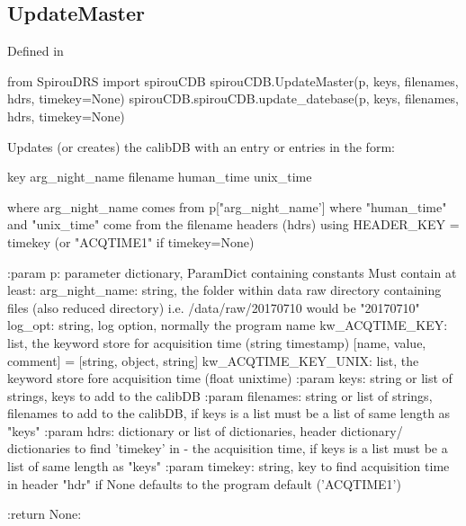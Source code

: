 \noindent\begin{minipage}{\textwidth}
\subsection{UpdateMaster}

Defined in \spirouCDB{}

\begin{pythonbox}
from SpirouDRS import spirouCDB
spirouCDB.UpdateMaster(p, keys, filenames, hdrs, timekey=None)
spirouCDB.spirouCDB.update_datebase(p, keys, filenames, hdrs, timekey=None)
\end{pythonbox}

\begin{pythondocstring}
Updates (or creates) the calibDB with an entry or entries in the form:

    {key} {arg_night_name} {filename} {human_time} {unix_time}

where arg_night_name comes from p["arg_night_name']
where "human_time" and "unix_time" come from the filename headers (hdrs)
    using HEADER_KEY = timekey (or "ACQTIME1" if timekey=None)

:param p: parameter dictionary, ParamDict containing constants
    Must contain at least:
            arg_night_name: string, the folder within data raw directory
                            containing files (also reduced directory) i.e.
                            /data/raw/20170710 would be "20170710"
            log_opt: string, log option, normally the program name
            kw_ACQTIME_KEY: list, the keyword store for acquisition time
                            (string timestamp)
                        [name, value, comment] = [string, object, string]
            kw_ACQTIME_KEY_UNIX: list, the keyword store fore acquisition
                                 time (float unixtime)
:param keys: string or list of strings, keys to add to the calibDB
:param filenames: string or list of strings, filenames to add to the
                  calibDB, if keys is a list must be a list of same length
                  as "keys"
:param hdrs: dictionary or list of dictionaries, header dictionary/
             dictionaries to find 'timekey' in - the acquisition time,
             if keys is a list must be a list of same length  as "keys"
:param timekey: string, key to find acquisition time in header "hdr" if
                None defaults to the program default ('ACQTIME1')

:return None:
\end{pythondocstring}
\end{minipage}

